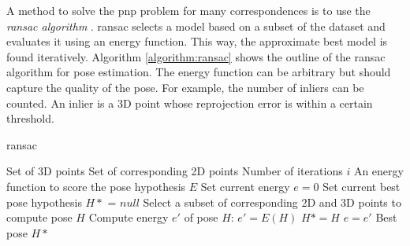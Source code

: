 A method to solve the \ac{pnp} problem for many correspondences is to use the \textit{\ac{ransac} algorithm} \cite{ransac}. \ac{ransac} selects a model based on a subset of the dataset and evaluates it using an energy function. This way, the approximate best model is found iteratively. Algorithm \ref{algorithm:ransac} shows the outline of the \ac{ransac} algorithm for pose estimation. The energy function can be arbitrary but should capture the quality of the pose. For example, the number of inliers can be counted. An inlier is a 3D point whose reprojection error is within a certain threshold.

\begin{algorithm}
\caption{\ac{ransac}} \label{algorithm:ransac}
\begin{algorithmic} 
\REQUIRE Set of 3D points
\REQUIRE Set of corresponding 2D points
\REQUIRE Number of iterations $i$
\REQUIRE An energy function to score the pose hypothesis $E$
\STATE Set current energy $e=0$
\STATE Set current best pose hypothesis $H*$ = $null$
\STATE Select a subset of corresponding 2D and 3D points to compute pose $H$
\STATE Compute energy $e'$ of pose $H$: $e'=E(H)$
\STATE $H* = H$
\STATE $e = e'$
\ENDIF
\ENDFOR
\RETURN Best pose $H*$
\end{algorithmic}
\end{algorithm}